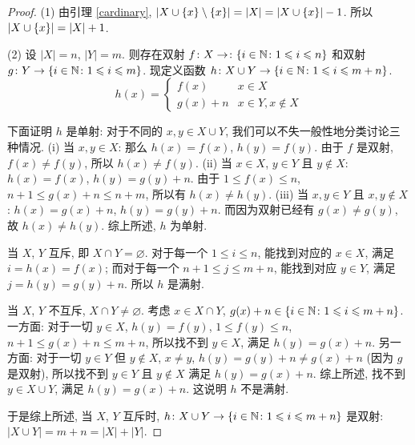\documentclass[UTF8]{ctexart}
\theoremstyle{mystyle}
\theoremstyle{myremark}
\theoremstyle{plain}
\newcommand{\N}{\mathbb N}
\DeclarePairedDelimiter\set{\{}{\}}
\begin{document}
\begin{proof}
    (1) 由引理 \ref{cardinary}, $ |X \cup \set{x} \setminus \set{x}| = |X| = |X \cup \set{x}| - 1 $. 所以 $ |X \cup \set{x}| = |X| + 1 $.

    (2) 设 $ |X| = n $, $ |Y| = m $. 则存在双射 $ f \colon X \to \colon \set{i \in \N \colon 1 \leqslant i \leqslant n} $ 和双射 $ g \colon Y \to \set{i \in \N \colon 1 \leqslant i \leqslant m} $. 现定义函数 $ h \colon X \cup Y \to \set{i \in \N \colon 1 \leqslant i \leqslant m + n} $.
    \[ h(x) = \begin{cases}
        f(x) & x \in X \\
        g(x) + n & x \in Y, x \notin X
    \end{cases} \]

    下面证明 $ h $ 是单射: 对于不同的 $ x, y \in X \cup Y $, 我们可以不失一般性地分类讨论三种情况. (i) 当 $ x, y \in X $: 那么 $ h(x) = f(x) $, $ h(y) = f(y) $. 由于 $ f $ 是双射, $ f(x) \neq f(y) $, 所以 $ h(x) \neq f(y) $. (ii) 当 $ x \in X $, $ y \in Y $ 且 $ y \notin X $: $ h(x) = f(x) $, $ h(y) = g(y) + n $. 由于 $ 1 \leqslant f(x) \leqslant n $, $ n + 1 \leqslant g(x) + n \leqslant n + m $, 所以有 $ h(x) \neq h(y) $. (iii) 当 $ x, y \in Y $ 且 $ x, y \notin X $: $ h(x) = g(x) + n $, $ h(y) = g(y) + n $. 而因为双射已经有 $ g(x) \neq g(y) $, 故 $ h(x) \neq h(y) $. 综上所述, $ h $ 为单射.

    当 $ X $, $ Y $ 互斥, 即 $ X \cap Y = \varnothing $. 对于每一个 $ 1 \leqslant i \leqslant n $, 能找到对应的 $ x \in X $, 满足 $ i = h(x) = f(x) $; 而对于每一个 $ n + 1 \leqslant j \leqslant m + n $, 能找到对应 $ y \in Y $, 满足 $ j = h(y) = g(y) + n $. 所以 $ h $ 是满射.

    当 $ X $, $ Y $ 不互斥, $ X \cap Y \neq \varnothing $. 考虑 $ x \in X \cap Y $, $ g(x) + n \in \set{i \in \N \colon 1 \leqslant i \leqslant m + n} $. 一方面: 对于一切 $ y \in X $, $ h(y) = f(y) $, $ 1 \leqslant f(y) \leqslant n $, $ n + 1 \leqslant g(x) + n \leqslant m + n $, 所以找不到 $ y \in X $, 满足 $ h(y) = g(x) + n $. 另一方面: 对于一切 $ y \in Y $ 但 $ y \notin X $, $ x \neq y $, $ h(y) = g(y) + n \neq g(x) + n $ (因为 $ g $ 是双射), 所以找不到 $ y \in Y $ 且 $ y \notin X $ 满足 $ h(y) = g(x) + n $. 综上所述, 找不到 $ y \in X \cup Y $, 满足 $ h(y) = g(x) + n $. 这说明 $ h $ 不是满射.

    于是综上所述, 当 $ X $, $ Y $ 互斥时, $ h \colon X \cup Y \to \set{i \in \N \colon 1 \leqslant i \leqslant m + n} $ 是双射: $ |X \cup Y| = m + n = |X| + |Y| $. 
    

\end{proof}
\end{document}
